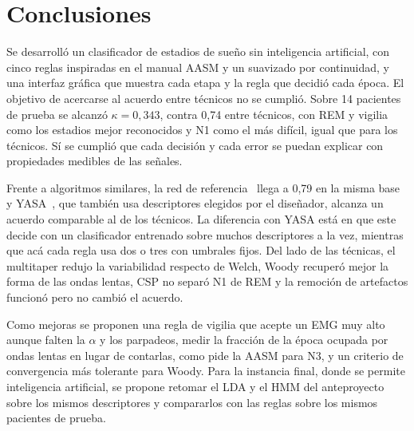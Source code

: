 \section{Conclusiones}
Se desarrolló un clasificador de estadios de sueño sin inteligencia artificial, con cinco reglas inspiradas en el manual AASM y un suavizado por continuidad, y una interfaz gráfica que muestra cada etapa y la regla que decidió cada época. El objetivo de acercarse al acuerdo entre técnicos no se cumplió. Sobre 14 pacientes de prueba se alcanzó $\kappa = 0{,}343$, contra 0,74 entre técnicos, con REM y vigilia como los estadios mejor reconocidos y N1 como el más difícil, igual que para los técnicos. Sí se cumplió que cada decisión y cada error se puedan explicar con propiedades medibles de las señales.

Frente a algoritmos similares, la red de referencia~\cite{alvarez2021} llega a 0,79 en la misma base y YASA~\cite{vallat2021}, que también usa descriptores elegidos por el diseñador, alcanza un acuerdo comparable al de los técnicos. La diferencia con YASA está en que este decide con un clasificador entrenado sobre muchos descriptores a la vez, mientras que acá cada regla usa dos o tres con umbrales fijos. Del lado de las técnicas, el multitaper redujo la variabilidad respecto de Welch, Woody recuperó mejor la forma de las ondas lentas, CSP no separó N1 de REM y la remoción de artefactos funcionó pero no cambió el acuerdo.

Como mejoras se proponen una regla de vigilia que acepte un EMG muy alto aunque falten la $\alpha$ y los parpadeos, medir la fracción de la época ocupada por ondas lentas en lugar de contarlas, como pide la AASM para N3, y un criterio de convergencia más tolerante para Woody. Para la instancia final, donde se permite inteligencia artificial, se propone retomar el LDA y el HMM del anteproyecto sobre los mismos descriptores y compararlos con las reglas sobre los mismos pacientes de prueba.
